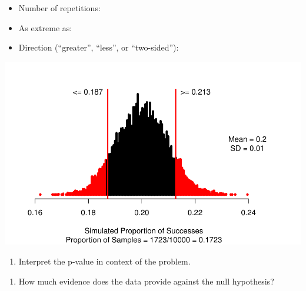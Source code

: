 \documentclass[
]{report}
\providecommand{\tightlist}{%
  \setlength{\itemsep}{0pt}\setlength{\parskip}{0pt}}
\begin{document}
\vspace{0.2in}

\begin{itemize}
\tightlist
\item
  Number of repetitions:
\end{itemize}

\vspace{0.2in}

\begin{itemize}
\tightlist
\item
  As extreme as:
\end{itemize}

\vspace{0.2in}

\begin{itemize}
\tightlist
\item
  Direction (``greater'', ``less'', or ``two-sided''):
\end{itemize}

\vspace{0.2in}

\begin{center}\includegraphics[width=0.7\linewidth]{05-UR-module3_review_files/figure-latex/unnamed-chunk-2-1} \end{center}

\begin{enumerate}
\def\labelenumi{\arabic{enumi}.}
\setcounter{enumi}{6}
\tightlist
\item
  Interpret the p-value in context of the problem.
\end{enumerate}

\vspace{1in}

\begin{enumerate}
\def\labelenumi{\arabic{enumi}.}
\setcounter{enumi}{7}
\tightlist
\item
  How much evidence does the data provide against the null hypothesis?
\end{enumerate}
\end{document}
